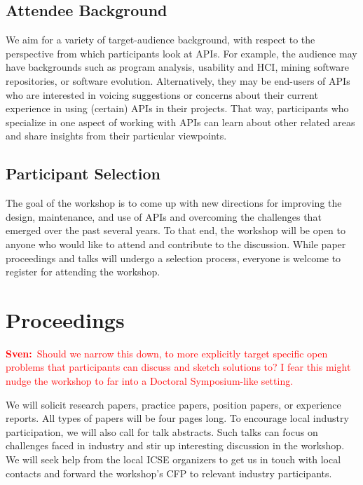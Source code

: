 \documentclass[10pt, conference]{IEEEtran}
\newcommand{\sa}[1]{{\textcolor{red}{\textbf{Sven:}~#1}}}
\begin{document}
\subsection{Attendee Background} 
We aim for a variety of target-audience background, with respect to the perspective from which participants look at APIs. For example, the audience may have backgrounds such as program analysis, usability and HCI, mining software repositories, or software evolution. Alternatively, they may be end-users of APIs who are interested in voicing suggestions or concerns about their current experience in using (certain) APIs in their projects. That way, participants who specialize in one aspect of working with APIs can learn about other related areas and share insights from their particular viewpoints.

\subsection{Participant Selection}
The goal of the workshop is to come up with new directions for improving the design, maintenance, and use of APIs and overcoming the challenges that emerged over the past several years. To that end, the workshop will be open to anyone who would like to attend and contribute to the discussion. While paper proceedings and talks will undergo a selection process, everyone is welcome to register for attending the workshop. 

\section{Proceedings}
\sa{Should we narrow this down, to more explicitly target specific open problems that participants can discuss and sketch solutions to? I fear this might nudge the workshop to far into a Doctoral Symposium-like setting.}

We will solicit research papers, practice papers, position papers, or experience reports. All types of papers will be four pages long. To encourage local industry participation, we will also call for talk abstracts. Such talks can focus on challenges faced in industry and stir up interesting discussion in the workshop. We will seek help from the local ICSE organizers to get us in touch with local contacts and forward the workshop's CFP to relevant industry participants.
\end{document}
